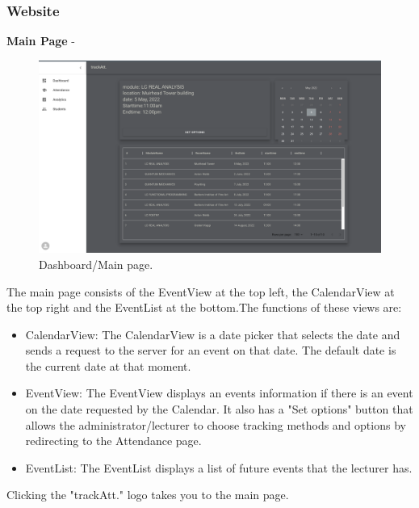 \subsubsection*{Website}
\textbf{Main Page} - 
\begin{figure}[ht!]
\includegraphics[scale=0.135]{Design & Implementation/images/Dashboard.png}
\caption{Dashboard/Main page.}
\end{figure}
The main page consists of the EventView at the top left, the CalendarView at the top right and the EventList at the bottom.The functions of these views are:
\begin{itemize}
\item CalendarView: The CalendarView is a date picker that selects the date and sends a request to the server for an event on that date. The default date is the current date at that moment.
\item EventView: The EventView displays an events information if there is an event on the date requested by the Calendar. It also has a "Set options" button that allows the administrator/lecturer to choose tracking methods and options by redirecting to the Attendance page.
\item EventList: The EventList displays a list of future events that the lecturer has.
\end{itemize}
Clicking the "trackAtt." logo takes you to the main page.


